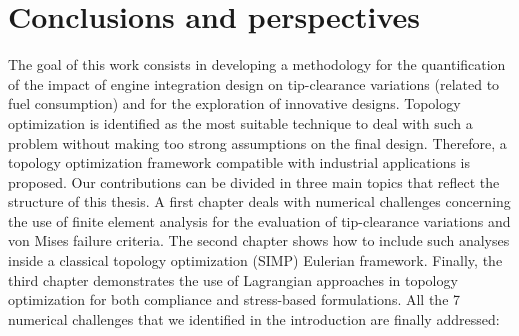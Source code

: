 \chapter{Conclusions and perspectives}
\label{chap:4}
The goal of this work consists in developing a methodology for the quantification of the impact of engine integration design on tip-clearance variations (related to fuel consumption) and for the exploration of innovative designs. Topology optimization is identified as the most suitable technique to deal with such a problem without making too strong assumptions on the final design.
Therefore, a topology optimization framework compatible with industrial applications is proposed. Our contributions can be divided in three main topics that reflect the structure of this thesis. A first chapter deals with numerical challenges concerning the use of finite element analysis for the evaluation of tip-clearance variations and von Mises failure criteria. The second chapter shows how to include such analyses inside a classical topology optimization (SIMP) Eulerian framework. Finally, the third chapter demonstrates the use of Lagrangian approaches in topology optimization for both compliance and stress-based formulations.
All the 7 numerical challenges that we identified in the introduction are finally addressed:
